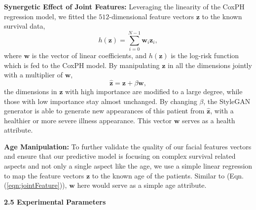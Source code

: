 \documentclass[runningheads]{llncs}
\newcommand{\vz}{\boldsymbol{z}}
\newcommand{\vw}{\boldsymbol{w}}
\newcommand{\vI}{\boldsymbol{I}}
\begin{document}
\noindent\textbf{Synergetic Effect of Joint Features:} Leveraging the linearity of the CoxPH regression model, we fitted the $512$-dimensional feature vectors $\vz$ to the known survival data,
\begin{equation}
h(\vz) =\sum_{i=0}^{N-1}\vw_i \vz_i,
\end{equation}
where $\vw$ is the vector of linear coefficients, and $h(\vz)$ is the log-risk function which is fed to the CoxPH model. By manipulating $\vz$ in all the dimensions jointly with a multiplier of $\vw$,
\begin{equation}
\hat{\vz} = \vz + \beta \vw,
\label{eqn:jointFeature}
\end{equation}
the dimensions in $\vz$ with high importance are modified to a large degree, while those with low importance stay almost unchanged. By changing $\beta$, the StyleGAN generator is able to generate new appearances of this patient from $\hat{\vz}$, with a healthier or more severe illness appearance. This vector $\vw$ serves as a health attribute.

\noindent\textbf{Age Manipulation:} To further validate the quality of our facial features vectors and ensure that our predictive model is focusing on complex survival related aspects and not only a single aspect like the age, we use a simple linear regression to map the feature vectors $\vz$ to the known age of the patients. Similar to (Eqn.\,(\ref{eqn:jointFeature})), $\vw$ here would serve as a simple age attribute.


\vspace{5pt}
\noindent\textbf{2.5 Experimental Parameters}
\vspace{5pt}
\end{document}
